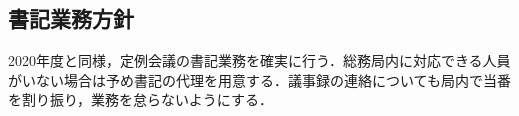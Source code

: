 \subsection*{書記業務方針}


2020年度と同様，定例会議の書記業務を確実に行う．総務局内に対応できる人員がいない場合は予め書記の代理を用意する．議事録の連絡についても局内で当番を割り振り，業務を怠らないようにする．
